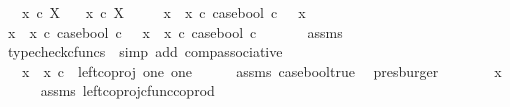 \begin{isabellebody}
\ \ \ {\isachardoublequoteopen}x{}\ {\isasymin}\isactrlsub c\ X{\isachardoublequoteclose}\isanewline
\ \ \ {\isachardoublequoteopen}x{}\ {\isasymin}\isactrlsub c\ X{\isachardoublequoteclose}\isanewline
\ \ \ \ \ {\isachardoublequoteopen}{\isacharparenleft}{\kern0pt}x{}\ {\isasymamalg}\ x{}\ {\isasymcirc}\isactrlsub c\ case{\isacharunderscore}{\kern0pt}bool{\isacharparenright}{\kern0pt}\ {\isasymcirc}\isactrlsub c\ {\isasymt}\ {\isacharequal}{\kern0pt}\ x{}{\isachardoublequoteclose}\isanewline
%
\isadelimproof
%
\endisadelimproof
%
\isatagproof
{}\isamarkupfalse%
\ {\isacharminus}{\kern0pt}\ \isanewline
\ \ \isamarkupfalse%
\ {\isachardoublequoteopen}{\isacharparenleft}{\kern0pt}x{}\ {\isasymamalg}\ x{}\ {\isasymcirc}\isactrlsub c\ case{\isacharunderscore}{\kern0pt}bool{\isacharparenright}{\kern0pt}\ {\isasymcirc}\isactrlsub c\ {\isasymt}\ {\isacharequal}{\kern0pt}\ {\isacharparenleft}{\kern0pt}x{}\ {\isasymamalg}\ x{}{\isacharparenright}{\kern0pt}\ {\isasymcirc}\isactrlsub c\ case{\isacharunderscore}{\kern0pt}bool\ {\isasymcirc}\isactrlsub c\ {\isasymt}{\isachardoublequoteclose}\isanewline
\ \ \ \ \isamarkupfalse%
\ assms\ \isamarkupfalse%
\ {\isacharparenleft}{\kern0pt}typecheck{\isacharunderscore}{\kern0pt}cfuncs\ {\isacharcomma}{\kern0pt}\ simp\ add{\isacharcolon}{\kern0pt}\ comp{\isacharunderscore}{\kern0pt}associative{}{\isacharparenright}{\kern0pt}\isanewline
\ \ \isamarkupfalse%
\ \isamarkupfalse%
\ {\isachardoublequoteopen}{\isachardot}{\kern0pt}{\isachardot}{\kern0pt}{\isachardot}{\kern0pt}\ {\isacharequal}{\kern0pt}\ {\isacharparenleft}{\kern0pt}x{}\ {\isasymamalg}\ x{}{\isacharparenright}{\kern0pt}\ {\isasymcirc}\isactrlsub c\ \ left{\isacharunderscore}{\kern0pt}coproj\ one\ one{\isachardoublequoteclose}\isanewline
\ \ \ \ \isamarkupfalse%
\ assms\ case{\isacharunderscore}{\kern0pt}bool{\isacharunderscore}{\kern0pt}true\ \isamarkupfalse%
\ presburger\isanewline
\ \ \isamarkupfalse%
\ \isamarkupfalse%
\ {\isachardoublequoteopen}{\isachardot}{\kern0pt}{\isachardot}{\kern0pt}{\isachardot}{\kern0pt}\ {\isacharequal}{\kern0pt}\ x{}{\isachardoublequoteclose}\isanewline
\ \ \ \ \isamarkupfalse%
\ assms\ left{\isacharunderscore}{\kern0pt}coproj{\isacharunderscore}{\kern0pt}cfunc{\isacharunderscore}{\kern0pt}coprod\ \isamarkupfalse%

\end{isabellebody}
